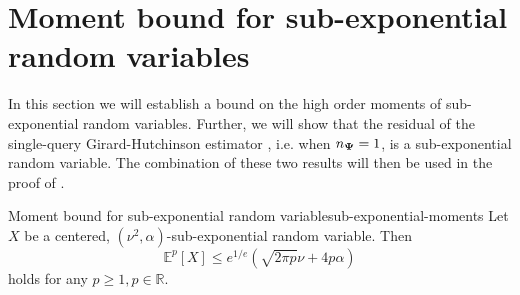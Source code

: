 
\section{Moment bound for sub-exponential random variables}

In this section we will establish a bound on the high order moments of sub-exponential random variables. Further, we will show that the residual of the single-query Girard-Hutchinson estimator , i.e. when $n_{\boldsymbol{\Psi}} = 1$, is a sub-exponential random variable. The combination of these two results will then be used in the proof of .

\begin{lemma}{Moment bound for sub-exponential random variable}{sub-exponential-moments}
    Let $X$ be a centered, $(\nu^2, \alpha)$-sub-exponential random variable. Then
    \begin{equation}
        \mathbb{E}^p[X] \leq e^{1/e} (\sqrt{2 \pi p} \nu + 4 p \alpha)
    \end{equation}
    holds for any $p \geq 1, p \in \mathbb{R}$.
\end{lemma}

